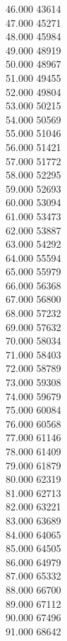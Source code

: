 { 46.000	43614 \\
 47.000	45271 \\
 48.000	45984 \\
 49.000	48919 \\
 50.000	48967 \\
 51.000	49455 \\
 52.000	49804 \\
 53.000	50215 \\
 54.000	50569 \\
 55.000	51046 \\
 56.000	51421 \\
 57.000	51772 \\
 58.000	52295 \\
 59.000	52693 \\
 60.000	53094 \\
 61.000	53473 \\
 62.000	53887 \\
 63.000	54292 \\
 64.000	55594 \\
 65.000	55979 \\
 66.000	56368 \\
 67.000	56800 \\
 68.000	57232 \\
 69.000	57632 \\
 70.000	58034 \\
 71.000	58403 \\
 72.000	58789 \\
 73.000	59308 \\
 74.000	59679 \\
 75.000	60084 \\
 76.000	60568 \\
 77.000	61146 \\
 78.000	61409 \\
 79.000	61879 \\
 80.000	62319 \\
 81.000	62713 \\
 82.000	63221 \\
 83.000	63689 \\
 84.000	64065 \\
 85.000	64505 \\
 86.000	64979 \\
 87.000	65332 \\
 88.000	66700 \\
 89.000	67112 \\
 90.000	67496 \\
 91.000	68642 \\
}
